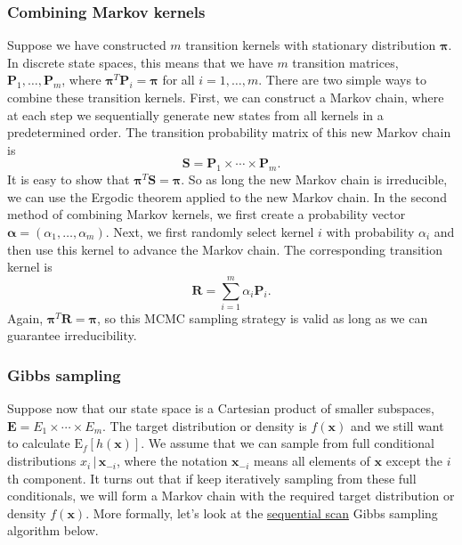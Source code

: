 \documentclass[11pt]{article}\usepackage[]{graphicx}\usepackage[]{color}
\numberwithin{algorithm}{section}
\theoremstyle{remark}
\theoremstyle{definition}
\begin{document}
\subsubsection{Combining Markov kernels}
Suppose we have constructed $m$ transition kernels with stationary distribution $\boldsymbol{\pi}$. 
In discrete state spaces, this means that we have $m$ transition matrices, $\mathbf{P}_1,\dots,\mathbf{P}_m$,
where $\boldsymbol{\pi}^T \mathbf{P}_i = \boldsymbol{\pi}$ for all $i = 1,\dots,m$. There are two simple ways
to combine these transition kernels. First, we can construct a Markov chain, where at each step we sequentially
generate new states from all kernels in a predetermined order. The transition probability matrix of this
new Markov chain is
\[
\mathbf{S} = \mathbf{P}_1 \times \cdots \times \mathbf{P}_m.
\]
It is easy to show that $\boldsymbol{\pi}^T \mathbf{S} = \boldsymbol{\pi}$. So as long the new Markov chain
is irreducible, we can use the Ergodic theorem applied to the new Markov chain. In the second method of combining
Markov kernels, we first create a probability vector $\boldsymbol{\alpha} = (\alpha_1,\dots,\alpha_m)$. Next,
we first randomly select kernel $i$ with probability $\alpha_i$ and then use this kernel to advance the Markov
chain. The corresponding transition kernel is
\[
\mathbf{R} = \sum_{i=1}^m \alpha_i \mathbf{P}_i.
\]
Again, $\boldsymbol{\pi}^T \mathbf{R} = \boldsymbol{\pi}$, so this MCMC sampling strategy is valid as long as
we can guarantee irreducibility.

\subsubsection{Gibbs sampling}
Suppose now that our state space is a Cartesian product of smaller subspaces,
$\mathbf{E} = E_1 \times \cdots \times E_m$. The target distribution or density is
$f(\mathbf{x})$ and we still want to calculate $\text{E}_{f}[h(\mathbf{x})]$.  We assume that we
can sample from full conditional distributions $x_i\,|\, \mathbf{x}_{-i}$, where the notation
$\mathbf{x}_{-i}$ means all elements of $\mathbf{x}$ except the $i$th component. It turns out
that if keep iteratively sampling from these full conditionals, we will form a Markov chain
with the required target distribution or density $f(\mathbf{x})$. More formally, let's look 
at the \underline{sequential scan} Gibbs sampling algorithm below.
\end{document}
